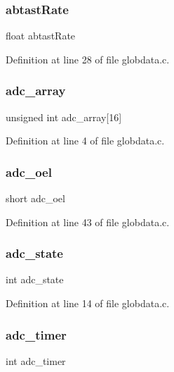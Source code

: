 \subsubsection{abtast\+Rate}
{\footnotesize\ttfamily float abtast\+Rate}



Definition at line 28 of file globdata.\+c.

\mbox{\label{globdata_8h_a3fe0576ac18faf17e1b5b05f1ea4a210}} 
\subsubsection{adc\+\_\+array}
{\footnotesize\ttfamily unsigned int adc\+\_\+array[16]}



Definition at line 4 of file globdata.\+c.

\mbox{\label{globdata_8h_ae3a819c589b7aa0f5ba6f78fa2776265}} 
\subsubsection{adc\+\_\+oel}
{\footnotesize\ttfamily short adc\+\_\+oel}



Definition at line 43 of file globdata.\+c.

\mbox{\label{globdata_8h_aafaf88f68ddff75e79b9993eb9613469}} 
\subsubsection{adc\+\_\+state}
{\footnotesize\ttfamily int adc\+\_\+state}



Definition at line 14 of file globdata.\+c.

\mbox{\label{globdata_8h_aa186a8fc885ad7481aebc685635bf12e}} 
\subsubsection{adc\+\_\+timer}
{\footnotesize\ttfamily int adc\+\_\+timer}



